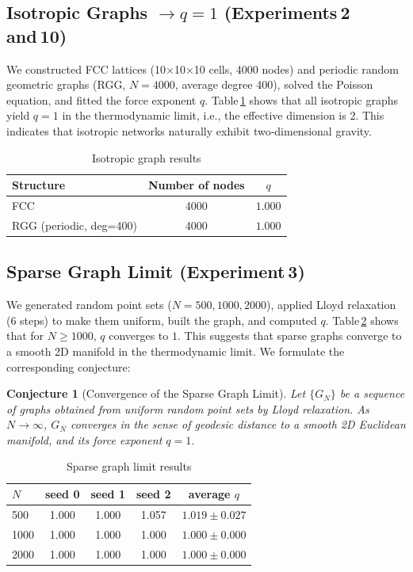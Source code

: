 \documentclass[12pt,a4paper]{article}
\newtheorem{conjecture}[theorem]{Conjecture}
\begin{document}
\subsection{Isotropic Graphs $\to q=1$ (Experiments 2 and 10)}
We constructed FCC lattices (10×10×10 cells, 4000 nodes) and periodic random geometric graphs (RGG, $N=4000$, average degree 400), solved the Poisson equation, and fitted the force exponent $q$. Table \ref{tab:iso} shows that all isotropic graphs yield $q=1$ in the thermodynamic limit, i.e., the effective dimension is 2. This indicates that isotropic networks naturally exhibit two‑dimensional gravity.

\begin{table}[htbp]
\centering
\caption{Isotropic graph results}
\label{tab:iso}
\begin{tabular}{lcc}
\toprule
Structure & Number of nodes & $q$ \\
\midrule
FCC & 4000 & $1.000$ \\
RGG (periodic, deg=400) & 4000 & $1.000$ \\
\bottomrule
\end{tabular}
\end{table}

\subsection{Sparse Graph Limit (Experiment 3)}
We generated random point sets ($N=500,1000,2000$), applied Lloyd relaxation (6 steps) to make them uniform, built the graph, and computed $q$. Table \ref{tab:sparse} shows that for $N\ge 1000$, $q$ converges to $1$. This suggests that sparse graphs converge to a smooth 2D manifold in the thermodynamic limit. We formulate the corresponding conjecture:

\begin{conjecture}[Convergence of the Sparse Graph Limit]
Let $\{G_N\}$ be a sequence of graphs obtained from uniform random point sets by Lloyd relaxation. As $N\to\infty$, $G_N$ converges in the sense of geodesic distance to a smooth 2D Euclidean manifold, and its force exponent $q=1$.
\end{conjecture}

\begin{table}[htbp]
\centering
\caption{Sparse graph limit results}
\label{tab:sparse}
\begin{tabular}{lcccc}
\toprule
$N$ & seed 0 & seed 1 & seed 2 & average $q$ \\
\midrule
500 & 1.000 & 1.000 & 1.057 & $1.019\pm0.027$ \\
1000 & 1.000 & 1.000 & 1.000 & $1.000\pm0.000$ \\
2000 & 1.000 & 1.000 & 1.000 & $1.000\pm0.000$ \\
\bottomrule
\end{tabular}
\end{table}
\end{document}
